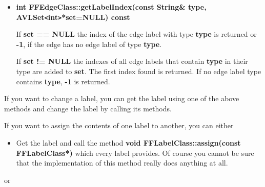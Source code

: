 \begin{itemize}
\item{\bf int FFEdgeClass::getLabelIndex(const String\& type,
    AVLSet\verb|<|int\verb|>|*set=NULL) const}

If {\bf set == NULL} the index of the edge label with type {\bf
  type} is returned or {\bf -1}, if the edge has no edge label of
type {\bf type}.

If {\bf set != NULL} the indexes of all edge labels that contain
{\bf type }in their type are added to {\bf set}. The first index
found is returned. If no edge label type contains {\bf type},
{\bf -1} is returned.

\end{itemize}

If you want to change a label, you can get the label using one of
the above methods and change the label by calling its methods.

If you want to assign the contents of one label to another, you
can either

\begin{itemize}
  
\item Get the label and call the method {\bf void
    FFLabelClass::assign(const FFLabelClass*)} which every label
  provides. Of course you cannot be sure that the implementation
  of this method really does anything at all.


\end{itemize}

or

